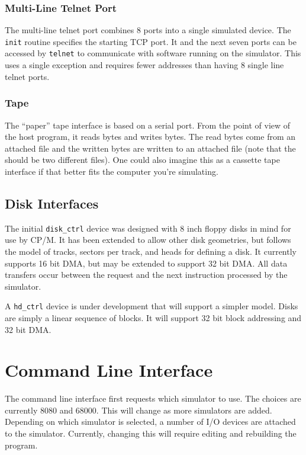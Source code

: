 \documentclass[10pt, openany]{book}
\begin{document}
\subsection{Multi-Line Telnet Port}
The multi-line telnet port combines 8 ports into a single simulated device.  The \verb|init| routine specifies the starting TCP port.  It and the next seven ports can be accessed by \verb|telnet| to communicate with software running on the simulator.  This uses a single exception and requires fewer addresses than having 8 single line telnet ports.

\subsection{Tape}
The ``paper'' tape interface is based on a serial port.  From the point of view of the host program, it reads bytes and writes bytes.  The read bytes come from an attached file and the written bytes are written to an attached file (note that the should be two different files).  One could also imagine this as a cassette tape interface if that better fits the computer you're simulating.

\section{Disk Interfaces}
The initial \verb|disk_ctrl| device was designed with 8 inch floppy disks in mind for use by CP/M.  It has been extended to allow other disk geometries, but follows the model of tracks, sectors per track, and heads for defining a disk.  It currently supports 16 bit DMA, but may be extended to support 32 bit DMA.  All data transfers occur between the request and the next instruction processed by the simulator.

A \verb|hd_ctrl| device is under development that will support a simpler model.  Disks are simply a linear sequence of blocks.  It will support 32 bit block addressing and 32 bit DMA.

\chapter{Command Line Interface}
The command line interface first requests which simulator to use.  The choices are currently 8080 and 68000.  This will change as more simulators are added.  Depending on which simulator is selected, a number of I/O devices are attached to the simulator.  Currently, changing this will require editing and rebuilding the program.
\end{document}
